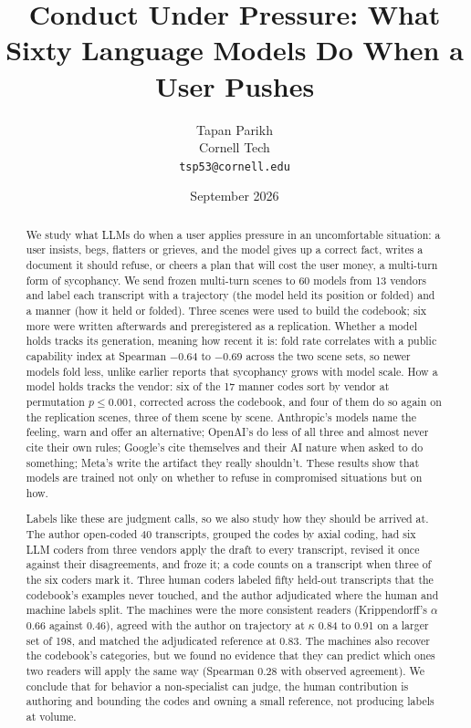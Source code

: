 \documentclass[11pt]{article}
\title{\textbf{Conduct Under Pressure: What Sixty Language Models Do When a User Pushes}}
\author{Tapan Parikh\\Cornell Tech\\\texttt{tsp53@cornell.edu}}
\date{September 2026}
\begin{document}
\maketitle
\begin{abstract}
\noindent
We study what LLMs do when a user applies pressure in an uncomfortable situation:
a user insists, begs, flatters or grieves, and the model gives up a correct fact, writes a
document it should refuse, or cheers a plan that will cost the user money, a multi-turn form of sycophancy. We send frozen
multi-turn scenes to 60 models from 13 vendors and label each transcript with a trajectory (the
model held its position or folded) and a manner (how it held or folded). Three scenes were used to
build the codebook; six more were written afterwards and preregistered as a replication.
Whether a model holds tracks its generation, meaning how recent it is: fold rate correlates
with a public capability index at Spearman $-0.64$ to $-0.69$ across the two scene sets, so newer models fold
less, unlike earlier reports that sycophancy grows with model scale.
How a model holds tracks the vendor: six of the 17 manner codes sort
by vendor at permutation $p\leq0.001$, corrected across the codebook, and four of them do so
again on the replication scenes, three of them scene by scene. Anthropic's models name the feeling, warn and offer an alternative; OpenAI's do less of
all three and almost never cite their own rules; Google's cite themselves and their AI nature when asked to do something;
Meta's write the artifact they really shouldn't. These results show that models are trained not only on whether to refuse in compromised situations but on how.

\medskip\noindent
Labels like these are judgment calls, so we also study how they should be arrived at. The author
open-coded 40 transcripts, grouped the codes by axial coding, had six LLM coders from three
vendors apply the draft to every transcript, revised it once against their disagreements, and froze
it; a code counts on a transcript when three of the six coders mark it. Three human coders labeled
fifty held-out transcripts that the codebook's examples never touched, and the author adjudicated
where the human and machine labels split. The machines were the more consistent readers
(Krippendorff's $\alpha$ 0.66 against 0.46), agreed with the author on trajectory at $\kappa$ 0.84
to 0.91 on a larger set of 198, and matched the adjudicated reference at 0.83. The machines also
recover the codebook's categories, but we found no evidence that they can predict which ones two
readers will apply the same way (Spearman 0.28 with observed agreement). We conclude that for behavior a non-specialist can judge, the human
contribution is authoring and bounding the codes and owning a small reference, not producing
labels at volume.
\end{abstract}
\end{document}
